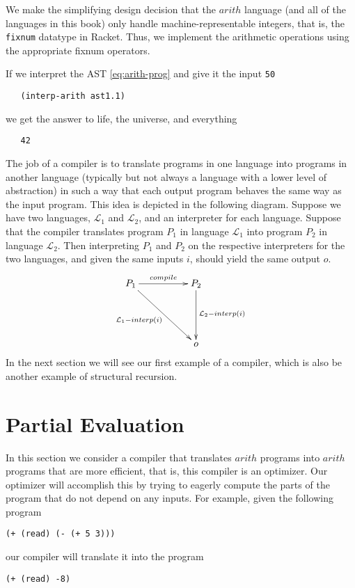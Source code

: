 \documentclass[12pt]{book}
\newcommand{\itm}[1]{\ensuremath{\mathit{#1}}}
\begin{document}
We make the simplifying design decision that the $\itm{arith}$
language (and all of the languages in this book) only handle
machine-representable integers, that is, the \texttt{fixnum} datatype
in Racket. Thus, we implement the arithmetic operations using the
appropriate fixnum operators.

If we interpret the AST \eqref{eq:arith-prog} and give it the input
\texttt{50}
\begin{lstlisting}
   (interp-arith ast1.1)
\end{lstlisting}
we get the answer to life, the universe, and everything
\begin{lstlisting}
   42
\end{lstlisting}

The job of a compiler is to translate programs in one language into
programs in another language (typically but not always a language with
a lower level of abstraction) in such a way that each output program
behaves the same way as the input program. This idea is depicted in
the following diagram. Suppose we have two languages, $\mathcal{L}_1$
and $\mathcal{L}_2$, and an interpreter for each language.  Suppose
that the compiler translates program $P_1$ in language $\mathcal{L}_1$
into program $P_2$ in language $\mathcal{L}_2$.  Then interpreting
$P_1$ and $P_2$ on the respective interpreters for the two languages,
and given the same inputs $i$, should yield the same output $o$.
\begin{equation} \label{eq:compile-correct}
\xymatrix@=50pt{
  P_1 \ar[r]^{compile}\ar[dr]_{\mathcal{L}_1-interp(i)} & P_2 \ar[d]^{\mathcal{L}_2-interp(i)} \\
   & o
}
\end{equation}
In the next section we will see our first example of a compiler, which
is also be another example of structural recursion.


\section{Partial Evaluation}
\label{sec:partial-evaluation}

In this section we consider a compiler that translates $\itm{arith}$
programs into $\itm{arith}$ programs that are more efficient, that is,
this compiler is an optimizer. Our optimizer will accomplish this by
trying to eagerly compute the parts of the program that do not depend
on any inputs. For example, given the following program
\begin{lstlisting}
(+ (read) (- (+ 5 3)))
\end{lstlisting}
our compiler will translate it into the program
\begin{lstlisting}
(+ (read) -8)
\end{lstlisting}
\end{document}
